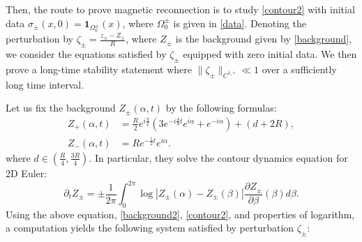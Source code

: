 \documentclass[11pt,reqno]{amsproc}
\newcommand{\pa}{\partial}
\newcommand{\ze}{\zeta}
\newcommand{\p}{\partial}
\newcommand{\pt}{\p_t}
\begin{document}
Then, the route to prove magnetic reconnection is to study \eqref{contour2} with initial data $\sigma_\pm(x,0) = \mathbf{1}_{\Omega_0^\pm}(x)$, where $\Omega_0^\pm$ is given in \eqref{data}. Denoting the perturbation by $\ze_\pm = \frac{z_\pm - Z_\pm}{R}$, where $Z_\pm$ is the background given by \eqref{background}, we consider the equations satisfied by $\ze_\pm$ equipped with zero initial data. We then prove a long-time stability statement where $\|\ze_\pm\|_{C^{1,\gamma}} \ll 1$ over a sufficiently long time interval.

Let us fix the background $Z_\pm(\alpha, t)$ by the following formulas:
\begin{equation}\label{background2}
\begin{aligned}
Z_+(\alpha,t) &= \frac{R}{2}e^{i\frac{\pi}{2}}\left(3e^{-i\frac49 t}e^{i\alpha} + e^{-i\alpha}\right)+ (d+2R),\\
Z_-(\alpha,t) &= Re^{-\frac{i}{2}t}e^{i\alpha}.
\end{aligned}
\end{equation}
where $d \in (\frac{R}{4}, \frac{3R}{4})$. In particular, they solve the contour dynamics equation for 2D Euler:
$$
\pt Z_\pm = \pm\frac{1}{2\pi}\int_0^{2\pi} \log|Z_\pm(\alpha) - Z_\pm(\beta)| \frac{\pa Z_\pm}{\pa \beta}(\beta) d\beta.
$$
Using the above equation, \eqref{background2}, \eqref{contour2}, and properties of logarithm, a computation yields the following system satisfied by perturbation $\ze_\pm$:
\end{document}
